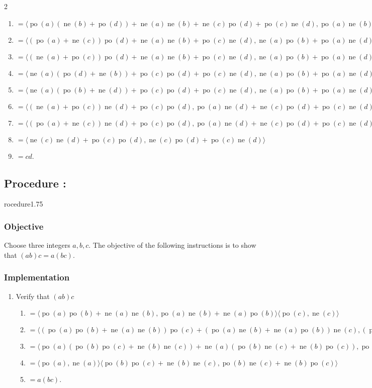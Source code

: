 \documentclass{article}
\DeclareMathOperator{\Po}{po}
\DeclareMathOperator{\Ne}{ne}
\newcounter{procedure}[part]
\newcommand{\procedure}[1]{\subsection*{Procedure \thepart:\theprocedure}\label{sec:procedure #1}\global\expandafter\edef\csname procedure#1\endcsname{\thepart:\theprocedure}\addtocounter{procedure}{1}}
\newcommand{\objective}{\subsubsection*{Objective}}
\newcommand{\implementation}{\subsubsection*{Implementation}}
\begin{document}
\begin{multicols}{2}
\begin{enumerate}
\begin{enumerate}
						\item $=\langle\Po(a)(\Ne(b)+\Po(d))+\Ne(a)\Ne(b)+\Ne(c)\Po(d)+\Po(c)\Ne(d),\Po(a)\Ne(b)+\Ne(a)\Po(b)+\Po(a)\Ne(d)+\Ne(c)\Po(d)+\Po(c)\Ne(d)\rangle$
						\item $=\langle(\Po(a)+\Ne(c))\Po(d)+\Ne(a)\Ne(b)+\Po(c)\Ne(d),\Ne(a)\Po(b)+\Po(a)\Ne(d)+\Ne(c)\Po(d)+\Po(c)\Ne(d)\rangle$
						\item $=\langle(\Ne(a)+\Po(c))\Po(d)+\Ne(a)\Ne(b)+\Po(c)\Ne(d),\Ne(a)\Po(b)+\Po(a)\Ne(d)+\Ne(c)\Po(d)+\Po(c)\Ne(d)\rangle$
						\item $=\langle\Ne(a)(\Po(d)+\Ne(b))+\Po(c)\Po(d)+\Po(c)\Ne(d),\Ne(a)\Po(b)+\Po(a)\Ne(d)+\Ne(c)\Po(d)+\Po(c)\Ne(d)\rangle$
						\item $=\langle\Ne(a)(\Po(b)+\Ne(d))+\Po(c)\Po(d)+\Po(c)\Ne(d),\Ne(a)\Po(b)+\Po(a)\Ne(d)+\Ne(c)\Po(d)+\Po(c)\Ne(d)\rangle$
						\item $=\langle(\Ne(a)+\Po(c))\Ne(d)+\Po(c)\Po(d),\Po(a)\Ne(d)+\Ne(c)\Po(d)+\Po(c)\Ne(d)\rangle$
						\item $=\langle(\Po(a)+\Ne(c))\Ne(d)+\Po(c)\Po(d),\Po(a)\Ne(d)+\Ne(c)\Po(d)+\Po(c)\Ne(d)\rangle$
						\item $=\langle\Ne(c)\Ne(d)+\Po(c)\Po(d),\Ne(c)\Po(d)+\Po(c)\Ne(d)\rangle$
						\item $=cd$.
					\end{enumerate}
				\end{enumerate}
		\procedure{1.75}
			\objective
				Choose three integers $a,b,c$. The objective of the following instructions is to show that $(ab)c=a(bc)$.
			\implementation
				\begin{enumerate}
					\item Verify that $(ab)c$
					\begin{enumerate}
						\item $=\langle\Po(a)\Po(b)+\Ne(a)\Ne(b),\Po(a)\Ne(b)+\Ne(a)\Po(b)\rangle\langle\Po(c),\Ne(c)\rangle$
						\item $=\langle(\Po(a)\Po(b)+\Ne(a)\Ne(b))\Po(c)+(\Po(a)\Ne(b)+\Ne(a)\Po(b))\Ne(c),(\Po(a)\Po(b)+\Ne(a)\Ne(b))\Ne(c)+(\Po(a)\Ne(b)+\Ne(a)\Po(b))\Po(c)\rangle$
						\item $=\langle\Po(a)(\Po(b)\Po(c)+\Ne(b)\Ne(c))+\Ne(a)(\Po(b)\Ne(c)+\Ne(b)\Po(c)),\Po(a)(\Po(b)\Ne(c)+\Ne(b)\Po(c))+\Ne(a)(\Po(b)\Po(c)+\Ne(b)\Ne(c))\rangle$
						\item $=\langle\Po(a),\Ne(a)\rangle\langle\Po(b)\Po(c)+\Ne(b)\Ne(c),\Po(b)\Ne(c)+\Ne(b)\Po(c)\rangle$
						\item $=a(bc)$.
					\end{enumerate}

\end{enumerate}
\end{multicols}
\end{document}
